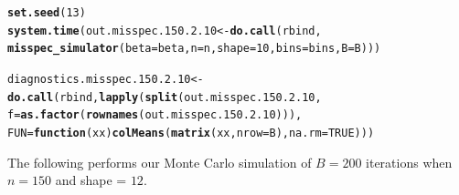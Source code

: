 \documentclass[11pt]{article}\usepackage[]{graphicx}\usepackage[]{color}
\makeatletter
\newcommand{\hlnum}[1]{\textcolor[rgb]{0.686,0.059,0.569}{#1}}%
\newcommand{\hlstd}[1]{\textcolor[rgb]{0.345,0.345,0.345}{#1}}%
\newcommand{\hlkwa}[1]{\textcolor[rgb]{0.161,0.373,0.58}{\textbf{#1}}}%
\newcommand{\hlkwb}[1]{\textcolor[rgb]{0.69,0.353,0.396}{#1}}%
\newcommand{\hlkwc}[1]{\textcolor[rgb]{0.333,0.667,0.333}{#1}}%
\newcommand{\hlkwd}[1]{\textcolor[rgb]{0.737,0.353,0.396}{\textbf{#1}}}%
\newenvironment{kframe}{%
 \def\at@end@of@kframe{}%
 \ifinner\ifhmode%
  \def\at@end@of@kframe{\end{minipage}}%
  \begin{minipage}{\columnwidth}%
 \fi\fi%
 \def\FrameCommand##1{\hskip\@totalleftmargin \hskip-\fboxsep
 \colorbox{shadecolor}{##1}\hskip-\fboxsep
     \hskip-\linewidth \hskip-\@totalleftmargin \hskip\columnwidth}%
 \MakeFramed {\advance\hsize-\width
   \@totalleftmargin\z@ \linewidth\hsize
   \@setminipage}}%
 {\par\unskip\endMakeFramed%
 \at@end@of@kframe}
\newenvironment{knitrout}{}{} %
\makeatother
\begin{document}
\begin{knitrout}
\color{fgcolor}\begin{kframe}
\begin{alltt}
\hlkwd{set.seed}\hlstd{(}\hlnum{13}\hlstd{)}
\hlkwd{system.time}\hlstd{(out.misspec.150.2.10} \hlkwb{<-} \hlkwd{do.call}\hlstd{(rbind,}
  \hlkwd{misspec_simulator}\hlstd{(}\hlkwc{beta} \hlstd{= beta,} \hlkwc{n} \hlstd{= n,} \hlkwc{shape} \hlstd{=} \hlnum{10}\hlstd{,} \hlkwc{bins} \hlstd{= bins,} \hlkwc{B} \hlstd{= B)))}
\end{alltt}


{\ttfamily\noindent\bfseries\color{errorcolor}{\#\# Error in chol.default(crossprod(x) + lambda[j] * diag(v)): the leading minor of order 5 is not positive definite}}

{\ttfamily\noindent\itshape\color{messagecolor}{\#\# Timing stopped at: 0.692 0 0.692}}\begin{alltt}
\hlstd{diagnostics.misspec.150.2.10} \hlkwb{<-} \hlkwd{do.call}\hlstd{(rbind,} \hlkwd{lapply}\hlstd{(}\hlkwd{split}\hlstd{(out.misspec.150.2.10,}
  \hlkwc{f} \hlstd{=} \hlkwd{as.factor}\hlstd{(}\hlkwd{rownames}\hlstd{(out.misspec.150.2.10))),}
  \hlkwc{FUN} \hlstd{=} \hlkwa{function}\hlstd{(}\hlkwc{xx}\hlstd{)} \hlkwd{colMeans}\hlstd{(}\hlkwd{matrix}\hlstd{(xx,} \hlkwc{nrow} \hlstd{= B),} \hlkwc{na.rm} \hlstd{=} \hlnum{TRUE}\hlstd{)))}
\end{alltt}


{\ttfamily\noindent\bfseries\color{errorcolor}{\#\# Error in split(out.misspec.150.2.10, f = as.factor(rownames(out.misspec.150.2.10))): object 'out.misspec.150.2.10' not found}}\end{kframe}
\end{knitrout}


The following performs our Monte Carlo simulation of $B = 200$ iterations 
when $n = 150$ and shape = $12$.
\end{document}
